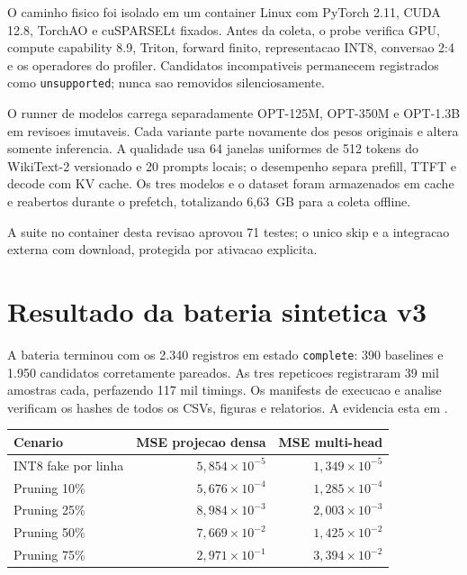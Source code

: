 O caminho fisico foi isolado em um container Linux com PyTorch 2.11, CUDA 12.8,
TorchAO e cuSPARSELt fixados. Antes da coleta, o probe verifica GPU, compute
capability 8.9, Triton, forward finito, representacao INT8, conversao 2:4 e os
operadores do profiler. Candidatos incompativeis permanecem registrados como
\texttt{unsupported}; nunca sao removidos silenciosamente.

O runner de modelos carrega separadamente OPT-125M, OPT-350M e OPT-1.3B em
revisoes imutaveis. Cada variante parte novamente dos pesos originais e altera
somente inferencia. A qualidade usa 64 janelas uniformes de 512 tokens do
WikiText-2 versionado e 20 prompts locais; o desempenho separa prefill, TTFT e
decode com KV cache. Os tres modelos e o dataset foram armazenados em cache e
reabertos durante o prefetch, totalizando 6,63~GB para a coleta offline.

A suite no container desta revisao aprovou 71 testes; o unico skip e a integracao
externa com download, protegida por ativacao explicita.

\section{Resultado da bateria sintetica v3}

A bateria terminou com os 2.340 registros em estado \texttt{complete}: 390
baselines e 1.950 candidatos corretamente pareados. As tres repeticoes
registraram 39 mil amostras cada, perfazendo 117 mil timings. Os manifests de
execucao e analise verificam os hashes de todos os CSVs, figuras e relatorios.
A evidencia esta em
.

\begin{longtable}{@{}lrr@{}}
\toprule
\textbf{Cenario} & \textbf{MSE projecao densa} & \textbf{MSE multi-head} \\
\midrule
INT8 fake por linha & $5{,}854\times10^{-5}$ & $1{,}349\times10^{-5}$ \\
Pruning 10\% & $5{,}676\times10^{-4}$ & $1{,}285\times10^{-4}$ \\
Pruning 25\% & $8{,}984\times10^{-3}$ & $2{,}003\times10^{-3}$ \\
Pruning 50\% & $7{,}669\times10^{-2}$ & $1{,}425\times10^{-2}$ \\
Pruning 75\% & $2{,}971\times10^{-1}$ & $3{,}394\times10^{-2}$ \\
\bottomrule
\end{longtable}

